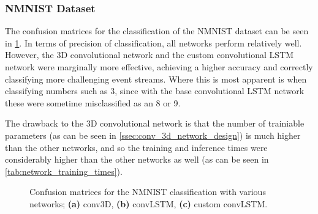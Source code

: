\subsubsection{NMNIST Dataset}

The confusion matrices for the classification of the NMNIST dataset can be seen in \cref{fig:nmnist_c_matrices}. In terms of precision of classification, all networks perform relatively well. However, the 3D convolutional network and the custom convolutional LSTM network were marginally more effective, achieving a higher accuracy and correctly classifying more challenging event streams. Where this is most apparent is when classifying numbers such as 3, since with the base convolutional LSTM network these were sometime misclassified as an 8 or 9. 

The drawback to the 3D convolutional network is that the number of trainiable parameters (as can be seen in \cref{ssec:conv_3d_network_design}) is much higher than the other networks, and so the training and inference times were considerably higher than the other networks as well (as can be seen in \cref{tab:network_training_times}).

\begin{figure}[htb]%
    \centering
    \qquad
    \qquad
    \caption{Confusion matrices for the NMNIST classification with various networks; \textbf{(a)} conv3D, \textbf{(b)} convLSTM, \textbf{(c)} custom convLSTM.}%
    \label{fig:nmnist_c_matrices}%
\end{figure}

